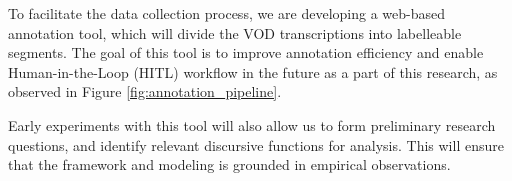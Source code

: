 To facilitate the data collection process, we are developing a web-based annotation tool, which will divide the VOD transcriptions into labelleable segments. The goal of this tool is to improve annotation efficiency and enable Human-in-the-Loop (HITL) workflow in the future as a part of this research, as observed in Figure \ref{fig:annotation_pipeline}. 

\medskip

Early experiments with this tool will also allow us to form preliminary research questions, and identify relevant discursive functions for analysis. This will ensure that the framework and modeling is grounded in empirical observations. 